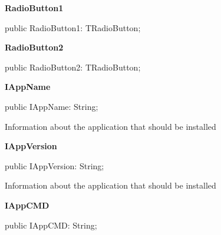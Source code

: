 \documentclass{report}
\newif\ifpdf
\begin{document}
\begin{list}{}
\begin{flushleft}
\ifpdf
\end{flushleft}
\fi


\par  \label{imainunit.TIWizFrm-RadioButton1}
\item[\textbf{RadioButton1}\hfill]
\ifpdf
\begin{flushleft}
\fi
\begin{ttfamily}
public RadioButton1: TRadioButton;\end{ttfamily}

\ifpdf
\end{flushleft}
\fi


\par  \label{imainunit.TIWizFrm-RadioButton2}
\item[\textbf{RadioButton2}\hfill]
\ifpdf
\begin{flushleft}
\fi
\begin{ttfamily}
public RadioButton2: TRadioButton;\end{ttfamily}

\ifpdf
\end{flushleft}
\fi


\par  \label{imainunit.TIWizFrm-IAppName}
\item[\textbf{IAppName}\hfill]
\ifpdf
\begin{flushleft}
\fi
\begin{ttfamily}
public IAppName: String;\end{ttfamily}

\ifpdf
\end{flushleft}
\fi


\par Information about the application that should be installed\label{imainunit.TIWizFrm-IAppVersion}
\item[\textbf{IAppVersion}\hfill]
\ifpdf
\begin{flushleft}
\fi
\begin{ttfamily}
public IAppVersion: String;\end{ttfamily}

\ifpdf
\end{flushleft}
\fi


\par Information about the application that should be installed\label{imainunit.TIWizFrm-IAppCMD}
\item[\textbf{IAppCMD}\hfill]
\ifpdf
\begin{flushleft}
\fi
\begin{ttfamily}
public IAppCMD: String;\end{ttfamily}


\end{flushleft}
\end{list}
\end{document}
